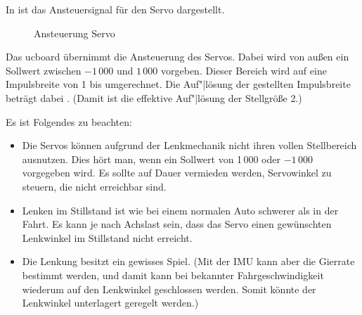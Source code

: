 In  ist das Ansteuersignal für den Servo dargestellt.

\begin{figure}[htb]%
	\centering
	
	\caption{Ansteuerung Servo}%
	\label{fig:Steering:Servo}%
\end{figure}


Das ucboard übernimmt die Ansteuerung des Servos. Dabei wird von außen ein Sollwert zwischen $-1\,000$ und $1\,000$ vorgeben. Dieser Bereich wird auf eine Impulsbreite von 1 bis  umgerechnet. Die Auf"|lösung der gestellten Impulsbreite beträgt dabei . (Damit ist die effektive Auf"|lösung der Stellgröße 2.)

Es ist Folgendes zu beachten:
\begin{itemize}
	\item Die Servos können aufgrund der Lenkmechanik nicht ihren vollen Stellbereich ausnutzen. Dies hört man, wenn ein Sollwert von 1\,000 oder $-1\,000$ vorgegeben wird. Es sollte auf Dauer vermieden werden, Servowinkel zu steuern, die nicht erreichbar sind.
	\item Lenken im Stillstand ist wie bei einem normalen Auto schwerer als in der Fahrt. Es kann je nach Achslast sein, dass das Servo einen gewünschten Lenkwinkel im Stillstand nicht erreicht. 
	\item Die Lenkung besitzt ein gewisses Spiel. (Mit der IMU kann aber die Gierrate bestimmt werden, und damit kann bei bekannter Fahrgeschwindigkeit wiederum auf den Lenkwinkel geschlossen werden. Somit könnte der Lenkwinkel unterlagert geregelt werden.)
\end{itemize}




